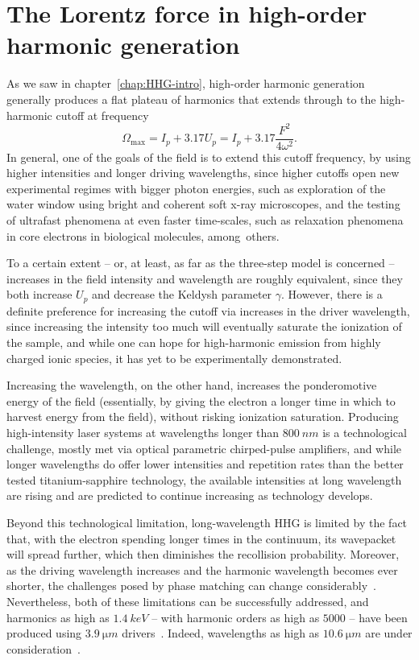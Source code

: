 \section{The Lorentz force in high-order harmonic generation}

As we saw in chapter~\ref{chap:HHG-intro}, high-order harmonic generation generally produces a flat plateau of harmonics that extends through to the high-harmonic cutoff at frequency
\begin{equation}
\Omega_\mathrm{max}=I_p + 3.17U_p = I_p + 3.17 \frac{F^2}{4\omega^2}.
\end{equation}
In general, one of the goals of the field is to extend this cutoff frequency, by using higher intensities and longer driving wavelengths, since higher cutoffs open new experimental regimes with bigger photon energies, such as exploration of the water window using bright and coherent soft x-ray microscopes, and the testing of ultrafast phenomena at even faster time-scales, such as relaxation phenomena in core electrons in biological molecules, among~others. 

To a certain extent -- or, at least, as far as the three-step model is concerned -- increases in the field intensity and wavelength are roughly equivalent, since they both increase $U_p$ and decrease the Keldysh parameter $\gamma$. However, there is a definite preference for increasing the cutoff via increases in the driver wavelength, since increasing the intensity too much will eventually saturate the ionization of the sample, and while one can hope for high-harmonic emission from highly charged ionic species, it has yet to be experimentally demonstrated.

Increasing the wavelength, on the other hand, increases the ponderomotive energy of the field (essentially, by giving the electron a longer time in which to harvest energy from the field), without risking ionization saturation. Producing high-intensity laser systems at wavelengths longer than $\SI{800}{nm}$ is a technological challenge, mostly met via optical parametric chirped-pulse amplifiers, and while longer wavelengths do offer lower intensities and repetition rates than the better tested titanium-sapphire technology, the available intensities at long wavelength are rising and are predicted to continue increasing as technology develops.

Beyond this technological limitation, long-wavelength HHG is limited by the fact that, with the electron spending longer times in the continuum, its wavepacket will spread further, which then diminishes the recollision probability. Moreover, as the driving wavelength increases and the harmonic wavelength becomes ever shorter, the challenges posed by phase matching can change considerably~\cite{popmintchev_phase-matching_2009}. Nevertheless, both of these limitations can be successfully addressed, and harmonics as high as $\SI{1.4}{keV}$ -- with harmonic orders as high as $5000$ -- have been produced using $\SI{3.9}{\micro m}$ drivers~\cite{ popmintchev_record_2012}. Indeed, wavelengths as high as $\SI{10.6}{\micro m}$ are under consideration~\cite{ hernandez_nine-micron_2013, zhu_non-dipole_2016, emelina_possibility_2014}.




